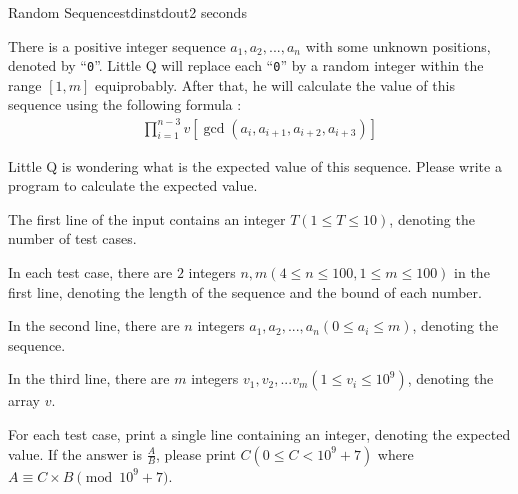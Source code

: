 \documentclass[11pt,a4paper,oneside]{article}
\newcommand{\txt}[1]{\mbox{``\texttt{#1}''}}
\newcommand{\timeLimit}{2 seconds}
\renewcommand{\defaultmemorylimit}{512 megabytes}
\begin{document}
\begin{problem}{Random Sequence}{stdin}{stdout}{\timeLimit}

There is a positive integer sequence $a_1,a_2,...,a_n$ with some unknown positions, denoted by \txt{0}. Little Q will replace each \txt{0} by a random integer within the range $[1,m]$ equiprobably. After that, he will calculate the value of this sequence using the following formula :
\begin{eqnarray*}
\prod_{i=1}^{n-3} v[\gcd(a_i,a_{i+1},a_{i+2},a_{i+3})]
\end{eqnarray*}\par
Little Q is wondering what is the expected value of this sequence. Please write a program to calculate the expected value.\par
\InputFile
The first line of the input contains an integer $T(1\leq T\leq10)$, denoting the number of test cases.\par
In each test case, there are $2$ integers $n,m(4\leq n\leq 100,1\leq m\leq 100)$ in the first line, denoting the length of the sequence and the bound of each number.\par
In the second line, there are $n$ integers $a_1,a_2,...,a_n(0\leq a_i\leq m)$, denoting the sequence.\par
In the third line, there are $m$ integers $v_1,v_2,...v_m(1\leq v_i\leq 10^9)$, denoting the array $v$.

\OutputFile
For each test case, print a single line containing an integer, denoting the expected value. If the answer is $\frac{A}{B}$, please print $C(0\leq C<10^9+7)$ where $A\equiv C\times B\pmod{10^9+7}$.
\Examples
\begin{example}
%
\end{example}
\end{problem}
\renewcommand{\timeLimit}{10 seconds}
\renewcommand{\defaultmemorylimit}{512 megabytes}
\end{document}
